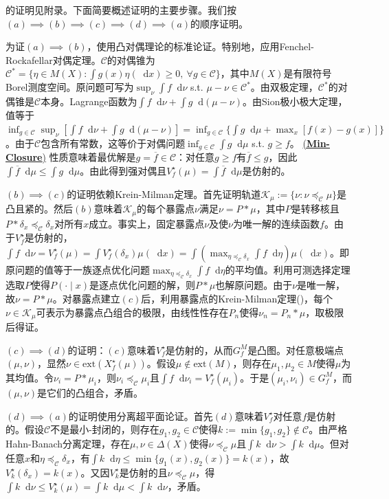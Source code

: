 \documentclass[12pt,letterpaper]{article}
\newenvironment{translation}{\color{blue}}{}
\theoremstyle{plain}
\theoremstyle{definition}
\theoremstyle{remark}
\newcommand{\C}{\mathcal{C}}
\newcommand{\Ext}{\mathrm{ext}}
\renewcommand*\d{\mathop{}\!\mathrm{d}}
\theoremstyle{definition}
\DeclareRobustCommand{\weqref}[2]{
  \leavevmode\nobreak\hbox{\hyperlink{#2}{\textup{(#1)}}}
}
\begin{document}
\begin{translation}
的证明见附录。下面简要概述证明的主要步骤。我们按$(a) \implies (b) \implies (c) \implies (d) \implies (a)$的顺序证明。

为证$(a) \implies (b)$，使用凸对偶理论的标准论证。特别地，应用Fenchel-Rockafellar对偶定理。$\C$的对偶锥为$\C^* = \{\eta \in M(X): \int g(x) \eta(\d x) \geq 0,\ \forall g \in \C\}$，其中$M(X)$是有限符号Borel测度空间。原问题可写为$\sup_{\nu} \int f \d \nu$ s.t. $\mu - \nu \in \C^*$。由双极定理，$\C^*$的对偶锥是$\C$本身。Lagrange函数为$\int f \d \nu + \int g \d(\mu - \nu)$。由Sion极小极大定理，值等于$\inf_{g \in \C} \sup_{\nu} [\int f \d \nu + \int g \d(\mu - \nu)] = \inf_{g \in \C} \{\int g \d \mu + \max_{x} [f(x) - g(x)]\}$。由于$\C$包含所有常数，这等价于对偶问题$\inf_{g \in \C} \int g \d \mu$ s.t. $g \geq f$。\weqref{\textbf{Min-Closure}}{eq:min-closure}性质意味着最优解是$g = \overline{f} \in \C$：对任意$g \geq f$有$\overline{f} \leq g$，因此$\int \overline{f} \d \mu \leq \int g \d \mu$。由此得到强对偶且$V^\star_f(\mu) = \int \overline{f} \d \mu$是仿射的。

$(b) \implies (c)$的证明依赖Krein-Milman定理。首先证明轨道$\mathcal{K}_\mu:=\{\nu: \nu \preceq_\C \mu\}$是凸且紧的。然后$(b)$意味着$\mathcal{K}_\mu$的每个暴露点$\nu$满足$\nu = P*\mu$，其中$P$是转移核且$P*\delta_x \preceq_\C \delta_x$对所有$x$成立。事实上，固定暴露点$\nu$及使$\nu$为唯一解的连续函数$f$。由于$V^\star_f$是仿射的，$\int f \d \nu = V^\star_f(\mu) = \int V^\star_f(\delta_x) \mu(\d x) = \int (\max_{\eta \preceq_\C \delta_x} \int f \d \eta) \mu(\d x)$。即原问题的值等于一族逐点优化问题$\max_{\eta \preceq_\C \delta_x} \int f \d \eta$的平均值。利用可测选择定理选取$P$使得$P(\cdot \mid x)$是逐点优化问题的解，则$P*\mu$也解原问题。由于$\nu$是唯一解，故$\nu = P*\mu$。对暴露点建立$(c)$后，利用暴露点的Krein-Milman定理(\citealt{Kleejr1958})，每个$\nu \in \mathcal{K}_\mu$可表示为暴露点凸组合的极限，由线性性存在$P_n$使得$\nu_n = P_n*\mu$，取极限后得证。

$(c) \implies (d)$的证明：$(c)$意味着$V_f^\star$是仿射的，从而$G_f^M$是凸图。对任意极端点$(\mu, \nu)$，显然$\nu \in \Ext(X^\star_f(\mu))$。假设$\mu \notin \Ext(M)$，则存在$\mu_1,\mu_2 \in M$使得$\mu$为其均值。令$\nu_i = P*\mu_i$，则$\nu_i \preceq_\C \mu_i$且$\int f \d \nu_i = V_f^\star(\mu_i)$。于是$(\mu_i, \nu_i) \in G_f^M$，而$(\mu, \nu)$是它们的凸组合，矛盾。

$(d) \implies (a)$的证明使用分离超平面论证。首先$(d)$意味着$V^\star_f$对任意$f$是仿射的。假设$\C$不是最小-封闭的，则存在$g_1, g_2 \in \C$使得$k := \min\{g_1, g_2\} \notin \C$。由严格Hahn-Banach分离定理，存在$\mu, \nu \in \Delta(X)$使得$\nu \preceq_\C \mu$且$\int k \d \nu > \int k \d \mu$。但对任意$x$和$\eta \preceq_\C \delta_x$，有$\int k \d \eta \leq \min\{g_1(x), g_2(x)\} = k(x)$，故$V^\star_k(\delta_x) = k(x)$。又因$V^\star_k$是仿射的且$\nu \preceq_\C \mu$，得$\int k \d \nu \leq V^\star_k(\mu) = \int k \d \mu < \int k \d \nu$，矛盾。
\end{translation}
\end{document}
